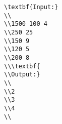 \begin{verbatim}
\textbf{Input:}
\\
\\1500 100 4
\\250 25
\\150 9
\\120 5
\\200 8
\\\textbf{
\\Output:}
\\
\\2
\\3
\\4
\\\end{verbatim}